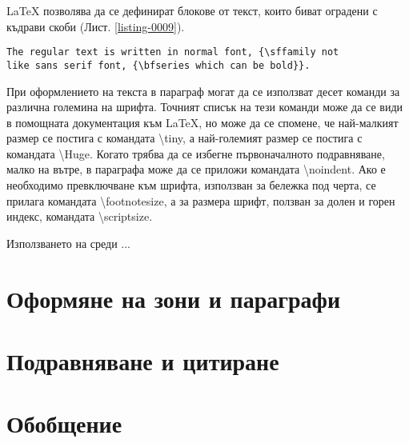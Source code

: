 LaTeX позволява да се дефинират блокове от текст, които биват оградени с къдрави скоби (Лист. \ref{listing-0009}). 

\begin{lstlisting}[language={[LaTeX]TeX}, caption=Блокове текст, label=listing-0009]
The regular text is written in normal font, {\sffamily not 
like sans serif font, {\bfseries which can be bold}}.
\end{lstlisting}

При оформлението на текста в параграф могат да се използват десет команди за различна големина на шрифта. Точният списък на тези команди може да се види в помощната документация към LaTeX, но може да се спомене, че най-малкият размер се постига с командата \textbackslash tiny, а най-големият размер се постига с командата \textbackslash Huge. Когато трябва да се избегне първоначалното подравняване, малко на вътре, в параграфа може да се приложи командата \textbackslash noindent. Ако е необходимо превключване към шрифта, използван за бележка под черта, се прилага командата \textbackslash footnotesize, а за размера шрифт, ползван за долен и горен индекс, командата \textbackslash scriptsize.

Използването на среди ...

\section{Оформяне на зони и параграфи}



\section{Подравняване и цитиране}



\section*{Обобщение}




